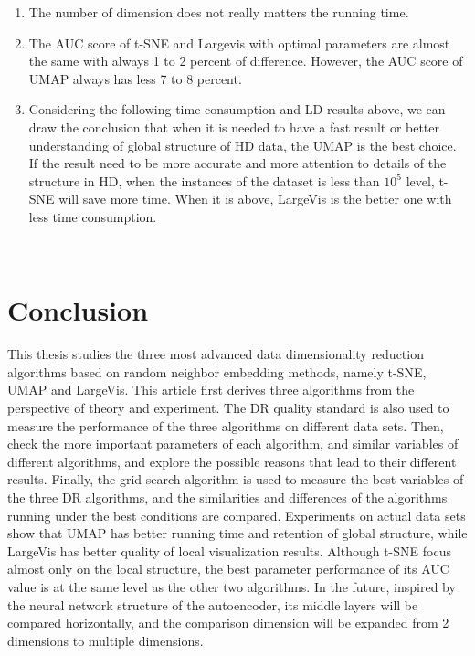 \begin{enumerate}[1)]
\item The number of dimension does not really matters the running time.
\item The AUC score of t-SNE and Largevis with optimal parameters are almost the same with always 1 to 2 percent of difference. However, the AUC score of UMAP always has less 7 to 8 percent. 
\item Considering the following time consumption and LD results above, we can draw the conclusion that when it is needed to have a fast result or better understanding of global structure of HD data, the UMAP is the best choice. If the result need to be more accurate and more attention to details of the structure in HD, when the instances of the dataset is less than $10^5$ level, t-SNE will save more time. When it is above, LargeVis is the better one with less time consumption\cite{ref5}.
\end{enumerate}\\

\chapter{Conclusion}

This thesis studies the three most advanced data dimensionality reduction algorithms based on random neighbor embedding methods, namely t-SNE, UMAP and LargeVis. This article first derives three algorithms from the perspective of theory and experiment. The DR quality standard is also used to measure the performance of the three algorithms on different data sets. Then, check the more important parameters of each algorithm, and similar variables of different algorithms, and explore the possible reasons that lead to their different results. Finally, the grid search algorithm is used to measure the best variables of the three DR algorithms, and the similarities and differences of the algorithms running under the best conditions are compared. Experiments on actual data sets show that UMAP has better running time and retention of global structure, while LargeVis has better quality of local visualization results. Although t-SNE focus almost only on the local structure, the best parameter performance of its AUC value is at the same level as the other two algorithms. In the future, inspired by the neural network structure of the autoencoder, its middle layers will be compared horizontally, and the comparison dimension will be expanded from 2 dimensions to multiple dimensions.


